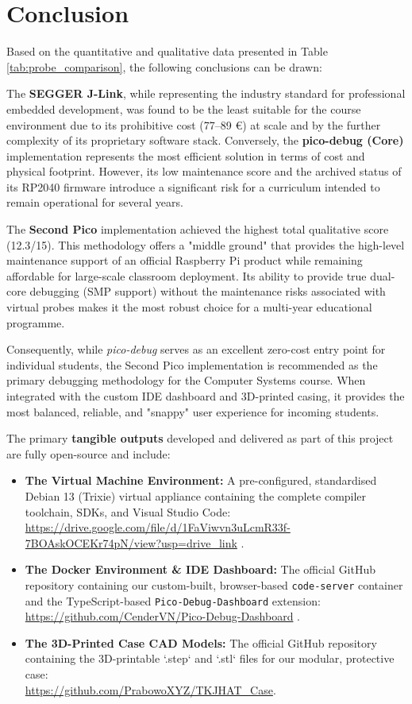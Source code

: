 \section{Conclusion}
Based on the quantitative and qualitative data presented in Table \ref{tab:probe_comparison}, the following conclusions can be drawn:

The \textbf{SEGGER J-Link}, while representing the industry standard for professional embedded development, was found to be the least suitable for the course environment due to its prohibitive cost (77--89 €) at scale and by the further complexity of its proprietary software stack. Conversely, the \textbf{pico-debug (Core)} implementation represents the most efficient solution in terms of cost and physical footprint. However, its low maintenance score and the archived status of its RP2040 firmware introduce a significant risk for a curriculum intended to remain operational for several years.

The \textbf{Second Pico} implementation achieved the highest total qualitative score (12.3/15). This methodology offers a "middle ground" that provides the high-level maintenance support of an official Raspberry Pi product while remaining affordable for large-scale classroom deployment. Its ability to provide true dual-core debugging (SMP support) without the maintenance risks associated with virtual probes makes it the most robust choice for a multi-year educational programme.

Consequently, while \textit{pico-debug} serves as an excellent zero-cost entry point for individual students, the Second Pico implementation is recommended as the primary debugging methodology for the Computer Systems course. When integrated with the custom IDE dashboard and 3D-printed casing, it provides the most balanced, reliable, and "snappy" user experience for incoming students.

The primary \textbf{tangible outputs} developed and delivered as part of this project are fully open-source and include:
\begin{itemize}
    \item \textbf{The Virtual Machine Environment:} A pre-configured, standardised Debian 13 (Trixie) virtual appliance containing the complete compiler toolchain, SDKs, and Visual Studio Code: \\ \url{https://drive.google.com/file/d/1FaViwvn3uLcmR33f-7BOAskOCEKr74pN/view?usp=drive_link} \cite{tkj_vm_history}.
    \item \textbf{The Docker Environment \& IDE Dashboard:} The official GitHub repository containing our custom-built, browser-based \texttt{code-server} container and the TypeScript-based \texttt{Pico-Debug-Dashboard} extension: \\ \url{https://github.com/CenderVN/Pico-Debug-Dashboard} \cite{pico_debug_dashboard}.
    \item \textbf{The 3D-Printed Case CAD Models:} The official GitHub repository containing the 3D-printable `.step` and `.stl` files for our modular, protective case: \\ \url{https://github.com/PrabowoXYZ/TKJHAT_Case}.
\end{itemize}

